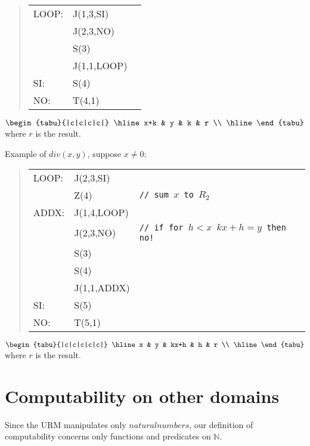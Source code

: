 \documentclass{amsbook}
\newcommand{\nat}{\ensuremath{\mathbb{N}}}
\newcommand{\comment}[1]{{\texttt{// #1}}}
\theoremstyle{definition}
\theoremstyle{remark}
\numberwithin{section}{chapter}
\numberwithin{equation}{chapter}
\begin{document}
  \begin{quote}
    \begin{tabular}{lll}            
      LOOP: & J(1,3,SI)   & \\
            & J(2,3,NO)   & \\
            & S(3)        & \\
            & J(1,1,LOOP) & \\
      SI:   & S(4)        & \\
      NO:   & T(4,1)      &
    \end{tabular}
  \end{quote}

$\begin{tabu}{|c|c|c|c|}
		\hline
		x+k & y & k & r \\
		\hline
	\end{tabu}$ where $r$ is the result.

Example of $div(x,y)$, suppose $x \not= 0$:

  \begin{quote}
    \begin{tabular}{lll}            
      LOOP: & J(2,3,SI)   &                                   \\
            & Z(4)        & \comment{sum $x$ to $R_2$}         \\
      ADDX: & J(1,4,LOOP) &                                   \\
            & J(2,3,NO)   & \comment{if for $h<x$  $kx+h=y$ then no!} \\
            & S(3)        &                                   \\
            & S(4)        &                                   \\
            & J(1,1,ADDX) &                                   \\
      SI:   & S(5)        &                                   \\
      NO:   & T(5,1)      &
    \end{tabular}
  \end{quote}

  $\begin{tabu}{|c|c|c|c|c|}
    \hline
    x & y & kx+h & h & r \\
    \hline
  \end{tabu}$ where $r$ is the result.

\chapter {Computability on other domains}
Since the URM manipulates only $natural numbers$, our definition of computability concerns only functions and predicates on $\nat$.
\end{document}
